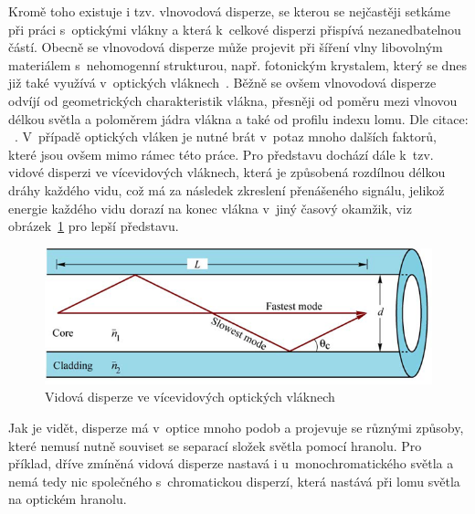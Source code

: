 Kromě toho existuje i tzv. vlnovodová disperze,
se kterou se nejčastěji setkáme při práci
s~optickými vlákny a která k~celkové disperzi
přispívá nezanedbatelnou částí. Obecně se
vlnovodová disperze může projevit při šíření
vlny libovolným materiálem s~nehomogenní
strukturou, např. fotonickým krystalem, který
se dnes již také využívá v~optických
vláknech~\cite{ing_prace}. Běžně se ovšem
vlnovodová disperze odvíjí od geometrických
charakteristik vlákna, přesněji od poměru
mezi vlnovou délkou světla a poloměrem jádra
vlákna a také od profilu indexu lomu. Dle
citace: ~\cite{bc_prace}.
V~případě optických vláken je nutné brát v~potaz
mnoho dalších faktorů, které jsou ovšem mimo
rámec této práce. Pro představu dochází dále
k~tzv. vidové disperzi ve vícevidových vláknech,
která je způsobená rozdílnou délkou dráhy
každého vidu, což má za následek zkreslení
přenášeného signálu, jelikož energie každého
vidu dorazí na konec vlákna v~jiný časový okamžik,
viz obrázek~\ref{fig:modal_dispersion} pro lepší
představu.
\begin{figure}[htbp]
    \centering
    \includegraphics[scale=0.65]{img/modal_dispersion.png}
    \caption{Vidová disperze ve vícevidových optických
    vláknech}
    \label{fig:modal_dispersion}
\end{figure}

Jak je vidět, disperze má v~optice mnoho podob
a projevuje se různými způsoby, které nemusí
nutně souviset se separací složek světla
pomocí hranolu. Pro příklad, dříve zmíněná
vidová disperze nastavá i u~monochromatického
světla a nemá tedy nic společného s~chromatickou
disperzí, která nastává při lomu světla na optickém
hranolu.

